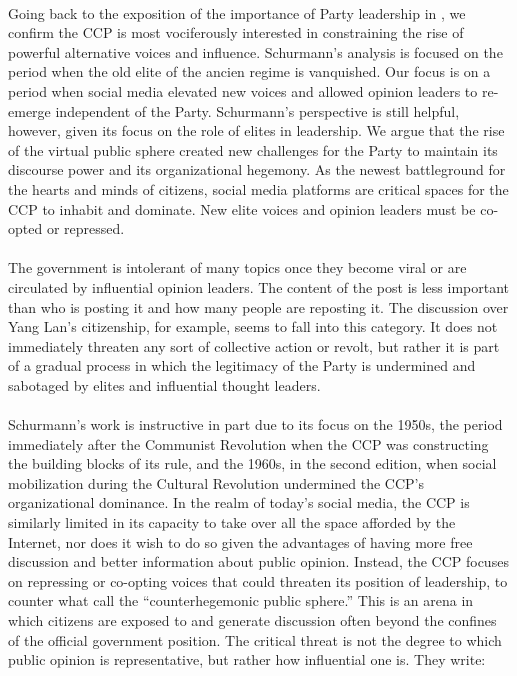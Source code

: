 \documentclass[12pt]{article}
\begin{document}
\begin{CJK*}{UTF8}{gbsn}
\paragraph{} Going back to the exposition of the importance of Party leadership in \cite{schurmann1968ideology}, we confirm the CCP is most vociferously interested in constraining the rise of powerful alternative voices and influence. Schurmann's analysis is focused on the period when the old elite of the ancien regime is vanquished. Our focus is on a period when social media elevated new voices and allowed opinion leaders to re-emerge independent of the Party. Schurmann's perspective is still helpful, however, given its focus on the role of elites in leadership. We argue that the rise of the virtual public sphere created new challenges for the Party to maintain its discourse power and its organizational hegemony. As the newest battleground for the hearts and minds of citizens, social media platforms are critical spaces for the CCP to inhabit and dominate. New elite voices and opinion leaders must be co-opted or repressed.
\paragraph{} The government is intolerant of many topics once they become viral or are circulated by influential opinion leaders. The content of the post is less important than who is posting it and how many people are reposting it. The discussion over Yang Lan's citizenship, for example, seems to fall into this category. It does not immediately threaten any sort of collective action or revolt, but rather it is part of a gradual process in which the legitimacy of the Party is undermined and sabotaged by elites and influential thought leaders.
\paragraph{} Schurmann's work is instructive in part due to its focus on the 1950s, the period immediately after the Communist Revolution when the CCP was constructing the building blocks of its rule, and the 1960s, in the second edition, when social mobilization during the Cultural Revolution undermined the CCP's organizational dominance. In the realm of today's social media, the CCP is similarly limited in its capacity to take over all the space afforded by the Internet, nor does it wish to do so given the advantages of having more free discussion and better information about public opinion. Instead, the CCP focuses on repressing or co-opting voices that could threaten its position of leadership, to counter what \cite{lei2015contesting} call the ``counterhegemonic public sphere.'' This is an arena in which citizens are exposed to and generate discussion often beyond the confines of the official government position. The critical threat is not the degree to which public opinion is representative, but rather how influential one is. They write:


\end{CJK*}
\end{document}
